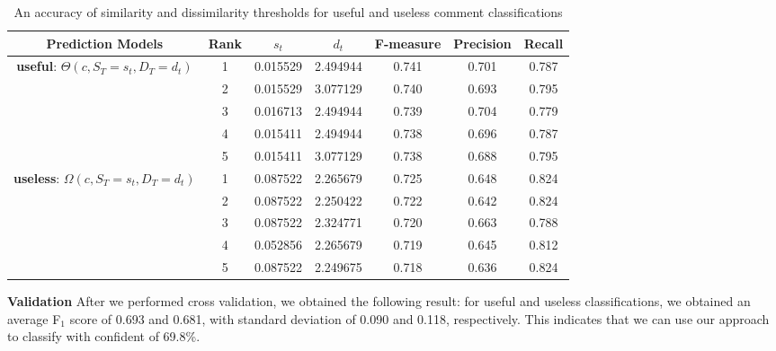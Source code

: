 \begin{table*}[!t]
\caption{An accuracy of similarity and dissimilarity thresholds for useful and useless comment classifications}
\small
\centering
\def\arraystretch{1.2}
\begin{tabular}{ccccccc}
\hline
Prediction Models  & Rank & $s_t$ & $d_t$ & F-measure & Precision & Recall \\ \hline \hline
\multirow{5}{*}{\textbf{useful}: $\Theta(c,S_T=s_t,D_T=d_t)$}
& 1 & 0.015529 & 2.494944 & 0.741 & 0.701 & 0.787 \\ \cline{2-7}
& 2 & 0.015529 & 3.077129 & 0.740 & 0.693 & 0.795 \\ \cline{2-7}
& 3 & 0.016713 & 2.494944 & 0.739 & 0.704 & 0.779 \\ \cline{2-7}
& 4 & 0.015411 & 2.494944 & 0.738 & 0.696 & 0.787 \\ \cline{2-7}
& 5 & 0.015411 & 3.077129 & 0.738 & 0.688 & 0.795
\\ \hline \hline
\multirow{5}{*}{\textbf{useless}: $\Omega(c,S_T=s_t,D_T=d_t)$}
& 1 & 0.087522 & 2.265679 & 0.725 & 0.648 & 0.824 \\ \cline{2-7}
& 2 & 0.087522 & 2.250422 & 0.722 & 0.642 & 0.824 \\ \cline{2-7}
& 3 & 0.087522 & 2.324771 & 0.720 & 0.663 & 0.788 \\ \cline{2-7}
& 4 & 0.052856 & 2.265679 & 0.719 & 0.645 & 0.812 \\ \cline{2-7}
& 5 & 0.087522 & 2.249675 & 0.718 & 0.636 & 0.824
\\ \hline
\end{tabular}
\label{tb:thresholds}
\end{table*}

\textbf{Validation} After we performed cross validation, we obtained the following result:
for useful and useless classifications,
we obtained an average F$_1$ score of 0.693 and 0.681,
with standard deviation of 0.090 and 0.118, respectively.
This indicates that we can use our approach to classify with confident of 69.8\%.
 

